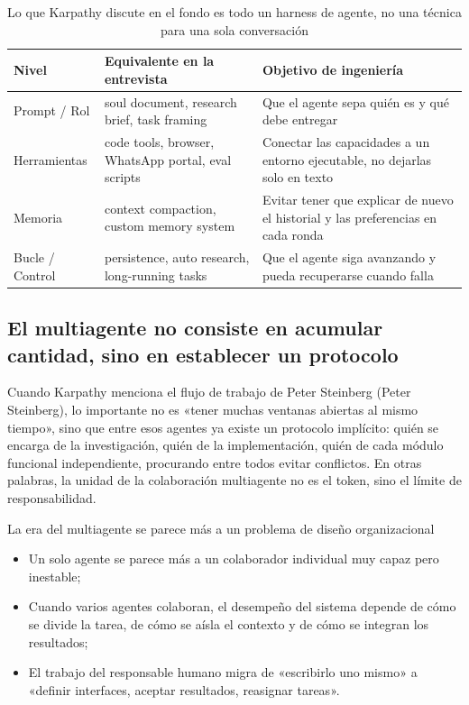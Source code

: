 \begin{table}[H]
\centering
\begin{tabular}{p{2.6cm}p{4.1cm}p{5.2cm}}
\toprule
\textbf{Nivel} & \textbf{Equivalente en la entrevista} & \textbf{Objetivo de ingeniería} \\
\midrule
Prompt / Rol & soul document, research brief, task framing & Que el agente sepa quién es y qué debe entregar \\
Herramientas & code tools, browser, WhatsApp portal, eval scripts & Conectar las capacidades a un entorno ejecutable, no dejarlas solo en texto \\
Memoria & context compaction, custom memory system & Evitar tener que explicar de nuevo el historial y las preferencias en cada ronda \\
Bucle / Control & persistence, auto research, long-running tasks & Que el agente siga avanzando y pueda recuperarse cuando falla \\
\bottomrule
\end{tabular}
\caption{Lo que Karpathy discute en el fondo es todo un harness de agente, no una técnica para una sola conversación}
\end{table}

\subsection{El multiagente no consiste en acumular cantidad, sino en establecer un protocolo}
Cuando Karpathy menciona el flujo de trabajo de Peter Steinberg (Peter Steinberg), lo importante no es «tener muchas ventanas abiertas al mismo tiempo», sino que entre esos agentes ya existe un protocolo implícito: quién se encarga de la investigación, quién de la implementación, quién de cada módulo funcional independiente, procurando entre todos evitar conflictos. En otras palabras, la unidad de la colaboración multiagente no es el token, sino el límite de responsabilidad.

\begin{knowledgebox}{La era del multiagente se parece más a un problema de diseño organizacional}
\begin{itemize}
    \item Un solo agente se parece más a un colaborador individual muy capaz pero inestable;
    \item Cuando varios agentes colaboran, el desempeño del sistema depende de cómo se divide la tarea, de cómo se aísla el contexto y de cómo se integran los resultados;
    \item El trabajo del responsable humano migra de «escribirlo uno mismo» a «definir interfaces, aceptar resultados, reasignar tareas».
\end{itemize}
\end{knowledgebox}

